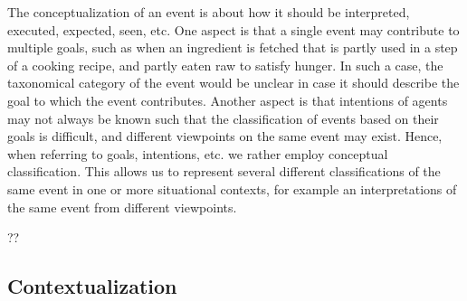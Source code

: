 The conceptualization of an event is about how it should be interpreted, executed, expected, seen, etc.
One aspect is that a single event may contribute to multiple goals, such as when an ingredient is fetched that is partly used in a step of a cooking recipe, and partly eaten raw to satisfy hunger.
In such a case, the taxonomical category of the event would be unclear in case it should describe the goal to which the event contributes.
Another aspect is that intentions of agents may not always be known such that the classification of events based on their goals is difficult, and different viewpoints on the same event may exist.
Hence, when referring to goals, intentions, etc. we rather employ conceptual classification.
This allows us to represent several different classifications of the same event in one or more situational contexts, for example an interpretations of the same event from different viewpoints.

\begin{ODP}{??}
\end{ODP}

\subsection{Contextualization}
\label{sec:episodes}

